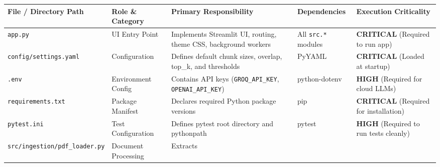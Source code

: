 \documentclass[
]{article}
\begin{document}
\begingroup\scriptsize
\begin{longtable}[]{@{}
  >{\raggedright\arraybackslash\sloppy}p{}
  >{\raggedright\arraybackslash\sloppy}p{}
  >{\raggedright\arraybackslash\sloppy}p{}
  >{\raggedright\arraybackslash\sloppy}p{}
  >{\raggedright\arraybackslash\sloppy}p{}@{}}
\toprule\noalign{}
\begin{minipage}[b]{\linewidth}\raggedright
File / Directory Path
\end{minipage} & \begin{minipage}[b]{\linewidth}\raggedright
Role \& Category
\end{minipage} & \begin{minipage}[b]{\linewidth}\raggedright
Primary Responsibility
\end{minipage} & \begin{minipage}[b]{\linewidth}\raggedright
Dependencies
\end{minipage} & \begin{minipage}[b]{\linewidth}\raggedright
Execution Criticality
\end{minipage} \\
\midrule\noalign{}
\endhead
\bottomrule\noalign{}
\endlastfoot
\texttt{app.\allowbreak py} & UI Entry Point & Implements Streamlit UI, routing,
theme CSS, background workers & All \texttt{src.*} modules &
\textbf{CRITICAL} (Required to run app) \\
\texttt{config/\allowbreak settings.\allowbreak yaml} & Configuration & Defines default chunk
sizes, overlap, top\_k, and thresholds & PyYAML & \textbf{CRITICAL}
(Loaded at startup) \\
\texttt{.\allowbreak env} & Environment Config & Contains API keys
(\texttt{GROQ\_\allowbreak API\_\allowbreak KEY}, \texttt{OPENAI\_\allowbreak API\_\allowbreak KEY}) & python-dotenv &
\textbf{HIGH} (Required for cloud LLMs) \\
\texttt{requirements.\allowbreak txt} & Package Manifest & Declares required Python
package versions & pip & \textbf{CRITICAL} (Required for
installation) \\
\texttt{pytest.\allowbreak ini} & Test Configuration & Defines pytest root directory
and pythonpath & pytest & \textbf{HIGH} (Required to run tests
cleanly) \\
\texttt{src/\allowbreak ingestion/\allowbreak pdf\_\allowbreak loader.\allowbreak py} & Document Processing & Extracts

\end{longtable}
\end{document}
